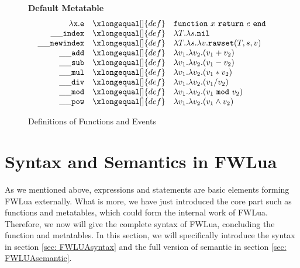 
\begin{figure}[P]
\caption{Definitions of Functions and Events}
{\bf Default Metatable}
\label{fig:FW2.1metamethods}
\[
\begin{array}{rclcl}
{\tt \aFunction{x}{e}} & \xlongequal[]{def}  & 
          {\tt function} ~x~{\tt return}~e~{\tt end}\\

  {\tt \_\_index}  & \xlongequal[]{def} & \aFunction{T}{\aFunction{s}{\tt nil}}\\
  
  {\tt \_\_newindex} & \xlongequal[]{def}  & \aFunction{T}{\aFunction{s}{\aFunction{v}{{\tt rawset}(T,s,v)}}}\\
 {\tt \_\_add}   & \xlongequal[]{def}  & \aFunction{v_1}{\aFunction{v_2}{(v_1+v_2)}} \\
 {\tt \_\_sub}   & \xlongequal[]{def}  & \aFunction{v_1}{\aFunction{v_2}{(v_1-v_2)}} \\
 {\tt \_\_mul}   & \xlongequal[]{def}  & \aFunction{v_1}{\aFunction{v_2}{(v_1*v_2)}} \\
 {\tt \_\_div}   & \xlongequal[]{def}  & \aFunction{v_1}{\aFunction{v_2}{(v_1/v_2)}} \\
 {\tt \_\_mod}   & \xlongequal[]{def}  & \aFunction{v_1}{\aFunction{v_2}{(v_1~{\tt mod}~v_2)}} \\
 {\tt \_\_pow}   & \xlongequal[]{def}  & \aFunction{v_1}{\aFunction{v_2}{(v_1 \wedge v_2)}} \\
         
\end{array}
\]
\end{figure}




\section{Syntax and Semantics in FWLua}\label{sec: syntax and semantic}
As we mentioned above, expressions and statements are basic elements forming FWLua externally. What is more, we have just introduced the core part such as functions and metatables, which could form the internal work of FWLua. Therefore, we now will give the complete syntax of FWLua, concluding the function and metatables. In this section, we will specifically introduce the syntax in section \ref{sec: FWLUAsyntax} and the full version of semantic in section \ref{sec: FWLUAsemantic}.

